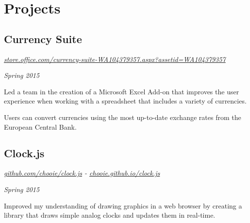 \section*{Projects}

\subsection*{Currency Suite}
\noindent\begin{minipage}[b]{0.8\textwidth}
  \flushleft
  \emph{\href{https://store.office.com/currency-suite-WA104379357.aspx?assetid=WA104379357} {store.office.com/currency-suite-WA104379357.aspx?assetid=WA104379357}}
\end{minipage}
\noindent\begin{minipage}[b]{0.2\textwidth}
  \flushright
  \emph{Spring 2015}
\end{minipage}

Led a team in the creation of a Microsoft Excel Add-on that improves the user experience when working with a spreadsheet that includes a variety of currencies.

Users can convert currencies using the most up-to-date exchange rates from the European Central Bank.

\subsection*{Clock.js}
\noindent\begin{minipage}[b]{0.5\textwidth}
  \flushleft
  \emph{\href{https://github.com/chooie/clock.js} {github.com/chooie/clock.js} - \href {https://chooie.github.io/clock.js} {chooie.github.io/clock.js}}
\end{minipage}
\noindent\begin{minipage}[b]{0.5\textwidth}
  \flushright
  \emph{Spring 2015}
\end{minipage}

Improved my understanding of drawing graphics in a web browser by creating a library that draws simple analog clocks and updates them in real-time.

